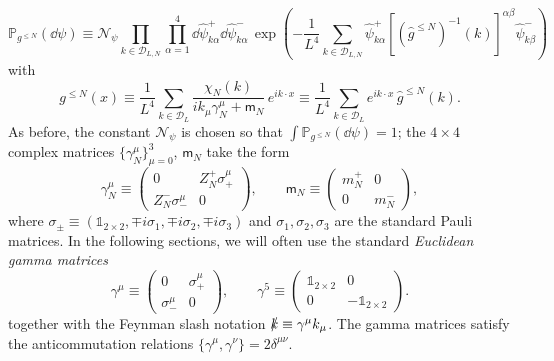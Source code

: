 \documentclass[a4paper, 11pt]{article}
\newcommand{\dgauss}[2]{\mathbb{P}_{#1}(\dd #2)}			%
\newcommand{\id}{\mathds{1}}								%
\newcommand{\sing}[2]{{#1}^{#2}}							%
\theoremstyle{thm}
\begin{document}
\begin{itemize}
\begin{equation}
\label{eq:fermionic_gaussian_measure}
\dgauss{\sing{g}{\le N}}{\psi} \equiv \mathcal{N}_\psi \prod_{k \in \mathcal{D}_{L, N}} \prod_{\alpha = 1}^4 \dd{\hat{\psi}^+_{k \alpha}} \dd{\hat{\psi}^-_{k \alpha}} \, \exp \left( - \frac{1}{L^4} \sum_{k \in \mathcal{D}_{L, N}} \!\!\! \hat{\psi}^+_{k \alpha} \left[(\sing{\hat{g}}{\le N})^{-1}(k) \right]^{\alpha \beta} \! \hat{\psi}^-_{k \beta} \right)
\end{equation} 
with
\begin{equation}
\label{eq:free_fermion_propagator}
\sing{g}{\le N}(x) \equiv \frac{1}{L^4} \sum_{k \in \mathcal{D}_{L}} \frac{\chi_N(k)}{i k_\mu \gamma^\mu_N + \mathsf{m}_N} \, e^{i k \cdot x} \equiv \frac{1}{L^4} \sum_{k \in \mathcal{D}_{L}} e^{i k \cdot x} \, \sing{\hat{g}}{\le N}(k).
\end{equation}
As before, the constant $\mathcal{N}_\psi$ is chosen so that $\int \dgauss{\sing{g}{\le N}}{\psi} = 1$; the $4 \times 4$ complex matrices $\lbrace \gamma^\mu_N \rbrace_{\mu = 0}^3$, $\mathsf{m}_N$ take the form
\begin{equation}
\label{eq:gamma_matrices_and_mass_matrix}
\gamma^\mu_N \equiv 
\begin{pmatrix}
0					&	Z^+_N \sigma_+^\mu \\
Z^-_N \sigma_-^\mu 	&	0
\end{pmatrix},
\qquad
\mathsf{m}_N \equiv 
\begin{pmatrix}
m^+_N	&	0	\\
0		&	m^-_N
\end{pmatrix},
\end{equation}
where $\sigma_{\pm} \equiv (\id_{2 \times 2}, \mp i \sigma_1, \mp i \sigma_2, \mp i \sigma_3)$ and $\sigma_1, \sigma_2, \sigma_3$ are the standard Pauli matrices. In the following sections, we will often use the standard \emph{Euclidean gamma matrices}
\begin{equation}
\label{eq:standard_gamma_matrices}
\gamma^\mu \equiv 
\begin{pmatrix}
0					&	\sigma_+^\mu \\
\sigma_-^\mu 		&	0
\end{pmatrix},
\qquad
\gamma^5 \equiv 
\begin{pmatrix}
\id_{2 \times 2}	&	0 \\
0 					&	-\id_{2 \times 2}
\end{pmatrix}.
\end{equation}
together with the Feynman slash notation $\slashed{k} \equiv \gamma^\mu k_\mu$. The gamma matrices satisfy the anticommutation relations $\lbrace \gamma^\mu, \gamma^\nu \rbrace = 2 \delta^{\mu \nu}$.

\end{itemize}
\end{document}
